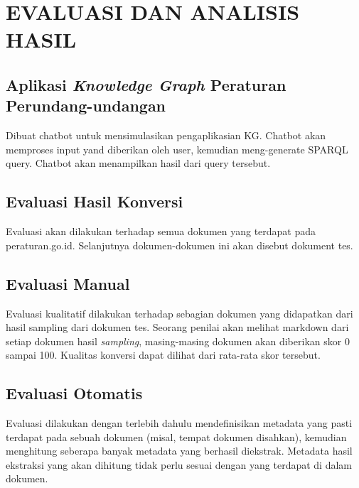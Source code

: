 \chapter{EVALUASI DAN ANALISIS HASIL}\label{bab:6}

\section{Aplikasi \textit{Knowledge Graph} Peraturan Perundang-undangan}
\label{aplikasi-kg-peraturan-perundang-undangan}
Dibuat chatbot untuk mensimulasikan pengaplikasian KG. Chatbot akan memproses input yand diberikan
oleh user, kemudian meng-generate SPARQL query. Chatbot akan menampilkan hasil dari query tersebut.

\section{Evaluasi Hasil Konversi}
\label{evaluasi-hasil-konversi}
Evaluasi akan dilakukan terhadap semua dokumen yang terdapat pada peraturan.go.id. Selanjutnya
dokumen-dokumen ini akan disebut dokument tes.

\section{Evaluasi Manual}
\label{evaluasi-manual}
Evaluasi kualitatif dilakukan terhadap sebagian dokumen yang didapatkan dari hasil sampling dari
dokumen tes. Seorang penilai akan melihat markdown dari setiap dokumen hasil \textit{sampling},
masing-masing dokumen akan diberikan skor 0 sampai 100. Kualitas konversi dapat dilihat dari
rata-rata skor tersebut.

\section{Evaluasi Otomatis}
\label{evaluasi-otomatis}
Evaluasi dilakukan dengan terlebih dahulu mendefinisikan metadata yang pasti terdapat pada sebuah
dokumen (misal, tempat dokumen disahkan), kemudian menghitung seberapa banyak metadata yang berhasil
diekstrak. Metadata hasil ekstraksi yang akan dihitung tidak perlu sesuai dengan yang terdapat di
dalam dokumen.
